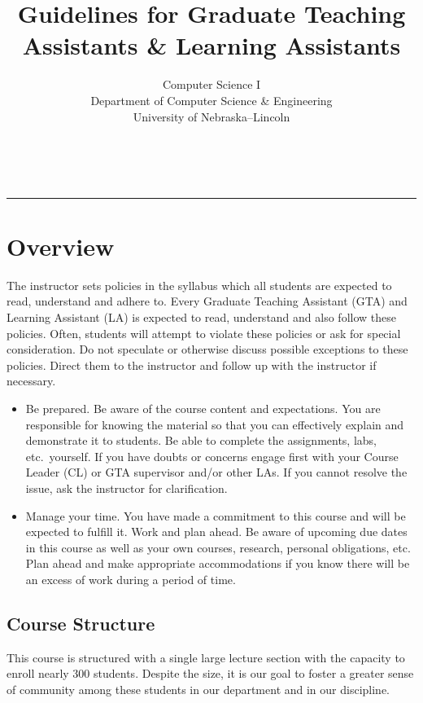 \documentclass[12pt]{scrartcl}
\title{Guidelines for Graduate Teaching Assistants \& Learning Assistants}\let\Title\@title
\subtitle{Computer Science I\\
{\small
\vskip1cm
Department of Computer Science \& Engineering \\
University of Nebraska--Lincoln}
\vskip-3cm}
\date{~}
\begin{document}
\maketitle


\hrule

\section*{Overview}

The instructor sets policies in the syllabus which all students 
are expected to read, understand and adhere to. Every Graduate 
Teaching Assistant (GTA) and Learning Assistant (LA) is expected 
to read, understand and also follow these policies.  Often, 
students will attempt to violate these policies or ask for special 
consideration.  Do not speculate or otherwise discuss possible 
exceptions to these policies.  Direct them to the instructor 
and follow up with the instructor if necessary.

\begin{itemize}
  \item Be prepared.  Be aware of the course content and expectations.
  You are responsible for knowing the material so that you can effectively
  explain and demonstrate it to students.  Be able to complete the assignments, 
  labs, etc.\ yourself.  If you have doubts or concerns engage first with
  your Course Leader (CL) or GTA supervisor and/or other LAs.  If you cannot
  resolve the issue, ask the instructor for clarification.
  \item Manage your time.  You have made a commitment to this course and
  will be expected to fulfill it.  Work and plan ahead.  Be aware of 
  upcoming due dates in this course as well as your own courses, research, 
  personal obligations, etc.  Plan ahead and make appropriate accommodations 
  if you know there will be an excess of work during a period of time.
\end{itemize}

\subsection*{Course Structure}

This course is structured with a single large lecture section with the
capacity to enroll nearly 300 students.  Despite the size, it is our 
goal to foster a greater sense of community among these students in 
our department and in our discipline.  
\end{document}
